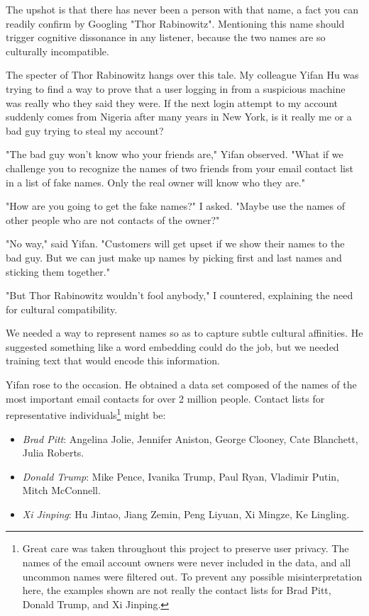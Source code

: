 \documentclass[10pt]{article}
\begin{document}
\begin{enumerate}
The upshot is that there has never been a person with that name, a fact you can readily confirm by Googling "Thor Rabinowitz". Mentioning this name should trigger cognitive dissonance in any listener, because the two names are so culturally incompatible.

The specter of Thor Rabinowitz hangs over this tale. My colleague Yifan Hu was trying to find a way to prove that a user logging in from a suspicious machine was really who they said they were. If the next login attempt to my account suddenly comes from Nigeria after many years in New York, is it really me or a bad guy trying to steal my account?

"The bad guy won't know who your friends are," Yifan observed. "What if we challenge you to recognize the names of two friends from your email contact list in a list of fake names. Only the real owner will know who they are."

"How are you going to get the fake names?" I asked. "Maybe use the names of other people who are not contacts of the owner?"

"No way," said Yifan. "Customers will get upset if we show their names to the bad guy. But we can just make up names by picking first and last names and sticking them together."

"But Thor Rabinowitz wouldn't fool anybody," I countered, explaining the need for cultural compatibility.

We needed a way to represent names so as to capture subtle cultural affinities. He suggested something like a word embedding could do the job, but we needed training text that would encode this information.

Yifan rose to the occasion. He obtained a data set composed of the names of the most important email contacts for over 2 million people. Contact lists for representative individuals\footnote{Great care was taken throughout this project to preserve user privacy. The names of the email account owners were never included in the data, and all uncommon names were filtered out. To prevent any possible misinterpretation here, the examples shown are not really the contact lists for Brad Pitt, Donald Trump, and Xi Jinping.} might be:

\begin{itemize}
  \item \textit{Brad Pitt}: Angelina Jolie, Jennifer Aniston, George Clooney, Cate Blanchett, Julia Roberts.
  \item \textit{Donald Trump}: Mike Pence, Ivanika Trump, Paul Ryan, Vladimir Putin, Mitch McConnell.
  \item \textit{Xi Jinping}: Hu Jintao, Jiang Zemin, Peng Liyuan, Xi Mingze, Ke Lingling.
\end{itemize}


\end{enumerate}
\end{document}
